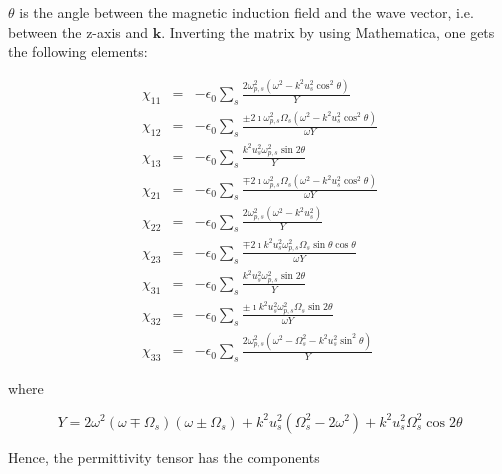 \documentclass[a4paper,11pt]{thesis}
\begin{document}
$\theta$ is the angle between the magnetic induction field and the wave vector, i.e. between the z-axis and $\mathbf{k}$. Inverting the matrix by using Mathematica, one gets the following elements:

\begin{eqnarray}
  \chi_{11} &=& - \epsilon_0   \sum_s \frac{2 \omega_{p,s}^2(\omega^2-k^2u_s^2 \cos^2\theta)}{Y}\nonumber \\
\chi_{12} &=& - \epsilon_0 \sum_s \frac{\pm 2 \imath \omega_{p,s}^2 \Omega_s(\omega^2-k^2u_s^2 \cos^2\theta)}{\omega Y} \nonumber\\
\chi_{13} &=& - \epsilon_0 \sum_s \frac{k^2u_s^2\omega_{p,s}^2 \sin 2\theta}{Y}\nonumber\\
\chi_{21} &=& - \epsilon_0 \sum_s \frac{\mp 2 \imath \omega_{p,s}^2 \Omega_s(\omega^2-k^2u_s^2 \cos^2\theta)}{\omega Y} \nonumber\\
\chi_{22} &=& -  \epsilon_0 \sum_s \frac{2\omega_{p,s}^2(\omega^2-k^2u_s^2)}{Y}\nonumber\\
\chi_{23} &=& - \epsilon_0  \sum_s \frac{\mp 2 \imath k^2 u_s^2 \omega_{p,s}^2 \Omega_s  \sin \theta \cos \theta}{\omega Y}\nonumber\\
\chi_{31} &=& - \epsilon_0  \sum_s \frac{k^2u_s^2\omega_{p,s}^2 \sin 2\theta}{Y}\nonumber\\
\chi_{32} &=& - \epsilon_0 \sum_s \frac{\pm \imath k^2 u_s^2 \omega_{p,s}^2 \Omega_s \sin 2 \theta}{\omega Y}\nonumber\\
\chi_{33} &=& - \epsilon_0 \sum_s \frac{2 \omega_{p,s}^2(\omega^2-\Omega_s^2-k^2u_s^2\sin^2\theta)}{Y}\nonumber
\end{eqnarray}

where

\begin{equation}
 Y=2\omega^2(\omega \mp \Omega_s)(\omega \pm \Omega_s)+k^2u_s^2( \Omega_s^2 -2\omega^2)+k^2u_s^2\Omega_s^2 \cos 2\theta
\end{equation}

Hence, the permittivity tensor has the components
\end{document}

